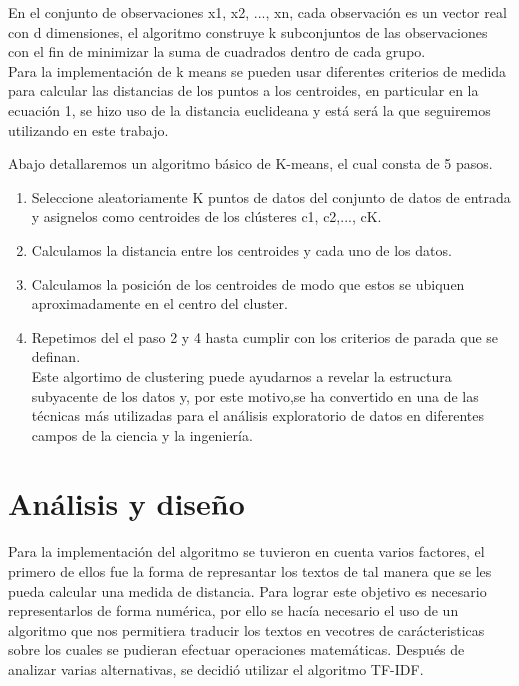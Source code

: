 \documentclass[conference,compsoc]{IEEEtran}
\begin{document}
En el conjunto de observaciones x1, x2, ..., xn, cada observación es un vector
real con d dimensiones, el algoritmo construye k subconjuntos de las
observaciones con el fin de minimizar la suma de cuadrados dentro de cada
grupo.\\

Para la implementación de k means se pueden usar diferentes criterios de medida
para calcular las distancias de los puntos a los centroides, en particular en
la ecuación 1, se hizo uso de la distancia euclideana y está será la que
seguiremos utilizando en este trabajo.

Abajo detallaremos un algoritmo básico de K-means, el cual consta de 5 pasos.\\

\begin{enumerate}[]
    \item Seleccione aleatoriamente K puntos de datos del conjunto de datos de
          entrada y asignelos como centroides de los clústeres c1, c2,..., cK.
    \item Calculamos la distancia entre los centroides y cada uno de los datos.
    \item Calculamos la posición de los centroides de modo que estos se ubiquen
          aproximadamente en el centro del cluster.
    \item Repetimos del el paso 2 y 4 hasta cumplir con los criterios de parada
          que se definan.\\

Este algortimo de clustering puede ayudarnos a revelar la estructura subyacente
de los datos y, por este motivo,se ha convertido en una de las técnicas más
utilizadas para el análisis exploratorio de datos en diferentes campos de la
ciencia y la ingeniería.

\end{enumerate}

\section{Análisis y diseño}

Para la implementación del algoritmo se tuvieron en cuenta varios factores,
el primero de ellos fue la forma de represantar los textos de tal manera que se les pueda calcular una medida de distancia. Para lograr este objetivo es
necesario representarlos de forma numérica, por ello se hacía necesario el uso
de un algoritmo que nos permitiera traducir los textos en vecotres de
carácteristicas sobre los cuales se pudieran efectuar operaciones matemáticas. Después de analizar varias alternativas, se decidió utilizar el algoritmo TF-IDF.\\
\end{document}
